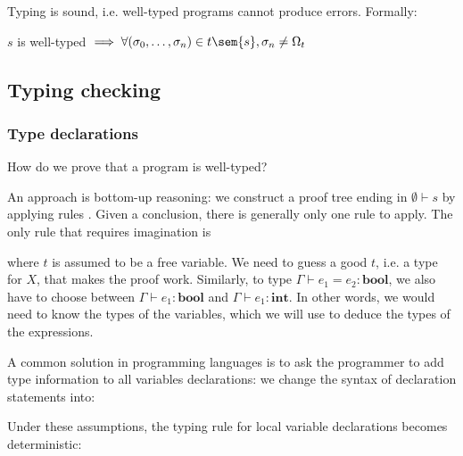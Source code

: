 \documentclass[toc, titlepaged]{../cs-classes/cs-classes}
\begin{document}
\begin{theorem}
    Typing is sound, i.e. well-typed programs cannot produce errors. Formally:
    \begin{center}
        $s$ is well-typed $\implies\forall (\sigma_0, \dots, \sigma_n)\in t\sem{s}, \sigma_n\neq\Omega_t$
    \end{center}
\end{theorem}

\subsection{Typing checking}
\subsubsection{Type declarations}
\begin{center}
    How do we prove that a program is well-typed?
\end{center}

An approach is bottom-up reasoning: we construct a proof tree ending in $\emptyset\vdash s$ by applying rules . Given a conclusion, there is generally only one rule to apply. The only rule that requires imagination is
\begin{figure}[H]
    \centering
    \begin{prooftree}
    \end{prooftree}
\end{figure}
\noindent where $t$ is assumed to be a free variable. We need to guess a good $t$, i.e. a type for $X$, that makes the proof work. Similarly, to type $\Gamma\vdash e_1=e_2 : \textbf{bool}$, we also have to choose between $\Gamma\vdash e_1:\textbf{bool}$ and $\Gamma\vdash e_1:\textbf{int}$. In other words, we would need to know the types of the variables, which we will use to deduce the types of the expressions.

A common solution in programming languages is to ask the programmer to add type information to all variables declarations: we change the syntax of declaration statements into:
\begin{figure}[H]
    \centering
    \begin{grammar}
        \grule{\dots}{}
    \end{grammar}
\end{figure}
Under these assumptions, the typing rule for local variable declarations becomes deterministic:
\begin{figure}[H]
    \centering
    \begin{prooftree}
    \end{prooftree}
\end{figure}
\end{document}
